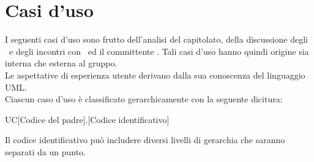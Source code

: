 \documentclass[../AnalisiDeiRequisiti.tex]{subfiles}
\begin{document}
	\section{Casi d'uso}
	I seguenti casi d'uso sono frutto dell'analisi del capitolato, della discussione degli
	\analisti\ e degli incontri con	\proponente\ ed il committente \vardanega.
	Tali casi d'uso hanno quindi origine sia interna che esterna al gruppo.\\
	Le aspettative di esperienza utente derivano dalla sua conoscenza del
	linguaggio UML.\\
	Ciascun caso d'uso è classificato gerarchicamente con la seguente dicitura:
	\begin{center}
		UC[Codice del padre].[Codice identificativo]
	\end{center}
	Il codice identificativo può includere diversi livelli di gerarchia che saranno
	separati da un punto.
\end{document}

